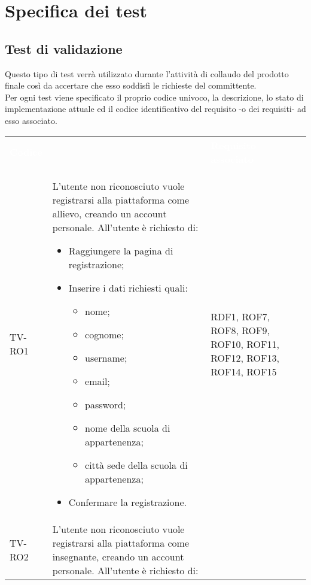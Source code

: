 \appendix
\section{Specifica dei test}
\subsection{Test di validazione}
Questo tipo di test verrà utilizzato durante l'attività di collaudo del prodotto finale così da accertare che esso soddisfi le richieste del committente. \\
Per ogni test viene specificato il proprio codice univoco, la descrizione, lo stato di implementazione attuale ed il codice identificativo del requisito -o dei requisiti- ad esso associato. 

	\begin{longtable}{|>{\centering\arraybackslash}m{1.6cm}|>{\centering\arraybackslash}m{6.41cm}|>{\centering\arraybackslash}m{3.1cm} | >{\centering\arraybackslash}m{2.6cm}|}		
		\rowcolor{LightBlue}
		\textbf{\textcolor{white}{Codice}}
		& \multicolumn{1}{|c|}{\textbf{\textcolor{white}{ Descrizione}}}
		& \textbf{\textcolor{white}{Requisito associato}}\\
		TV-RO1 & L'utente non riconosciuto vuole registrarsi alla piattaforma come allievo, creando un account personale. All'utente è richiesto di:
		\begin{itemize}
			\item Raggiungere la pagina di registrazione;
			\item Inserire i dati richiesti quali:
				\begin{itemize}
				 	\item nome;
				 	\item cognome;
				 	\item username;
				 	\item email;
				 	\item password;
				 	\item nome della scuola di appartenenza;
				 	\item città sede della scuola di appartenenza;
				\end{itemize}
			\item Confermare la registrazione.
		\end{itemize} & RDF1, ROF7, ROF8, ROF9, ROF10, ROF11, ROF12, ROF13, ROF14, ROF15 \\ \hline
		\rowcolor{LightGray}
		TV-RO2 & L'utente non riconosciuto vuole registrarsi alla piattaforma come insegnante, creando un account personale. All'utente è richiesto di:

\end{longtable}
